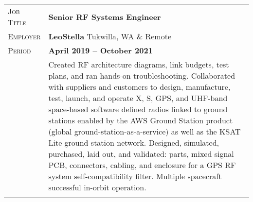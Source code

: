 \documentclass[a4paper, oneside, final]{scrartcl}
\newcommand{\gray}{\rowcolor[gray]{.90}} %
\begin{document}
\begin{center}
\begin{tabularx}{0.97\linewidth}{>{\raggedleft\scshape}p{2cm}X}
\gray Job Title & \textbf{Senior RF Systems Engineer}\\
\gray Employer & \textbf{LeoStella} \hfill Tukwilla, WA \& Remote\\
\gray Period & \textbf{April 2019 -- October 2021}\\
&
\vspace{-0.15 cm}
Created RF architecture diagrams, link budgets, test plans, and ran hands-on troubleshooting. Collaborated with suppliers and customers to design, manufacture, test, launch, and operate X, S, GPS, and UHF-band space-based software defined radios linked to ground stations enabled by the AWS Ground Station product (global ground-station-as-a-service) as well as the KSAT Lite ground station network.
\newline
\newline
Designed, simulated, purchased, laid out, and validated: parts, mixed signal PCB, connectors, cabling, and enclosure for a GPS RF system self-compatibility filter.  Multiple spacecraft successful in-orbit operation.
\\
\\
\end{tabularx}


\end{center}
\end{document}
